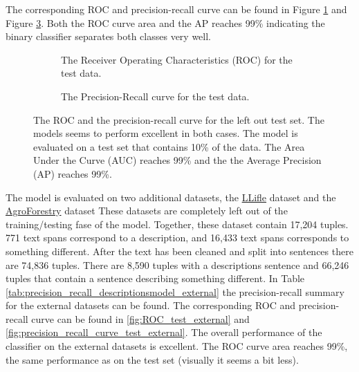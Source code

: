 \documentclass[a4paper, 12pt, oneside]{book} %
\begin{document}
\noindent
The corresponding ROC and precision-recall curve can be found in Figure \ref{fig:ROC_test} and Figure \ref{fig:precision_recall_curve_test}.
Both the ROC curve area and the AP reaches 99\% indicating the binary classifier separates both classes very well.

\begin{figure} [h]
     \centering
     \begin{subfigure}[b]{0.49\textwidth}
         \centering
         
         \caption{The Receiver Operating Characteristics (ROC) for the test data.}
         \label{fig:ROC_test}
     \end{subfigure}
     \hfill
     \begin{subfigure}[b]{0.49\textwidth}
         \centering
         
         \caption{The Precision-Recall curve for the test data.}
         \label{fig:precision_recall_curve_test}
     \end{subfigure}
     \caption{The ROC and the precision-recall curve for the left out test set. The models seems to perform excellent in both cases. The model is evaluated on a test set that contains 10\% of the data. The Area Under the Curve (AUC) reaches 99\% and the the Average Precision (AP) reaches 99\%.}
\end{figure}
The model is evaluated on two additional datasets, the \href{http://www.llifle.com/}{LLifle} dataset and the  \href{https://www.worldagroforestry.org/}{AgroForestry} dataset
These datasets are completely left out of the training/testing fase of the model.
Together, these dataset contain 17,204 tuples.
771 text spans correspond to a description, and 16,433 text spans corresponds to something different.
After the text has been cleaned and split into sentences there are 74,836 tuples.
There are 8,590 tuples with a descriptions sentence and 66,246 tuples that contain a sentence describing something different.
In Table \ref{tab:precision_recall_descriptionsmodel_external} the precision-recall summary for the external datasets can be found.
The corresponding ROC and precision-recall curve can be found in \ref{fig:ROC_test_external} and \ref{fig:precision_recall_curve_test_external}.
The overall performance of the classifier on the external datasets is excellent. 
The ROC curve area reaches 99\%, the same performance as on the test set (visually it seems a bit less).
\end{document}
